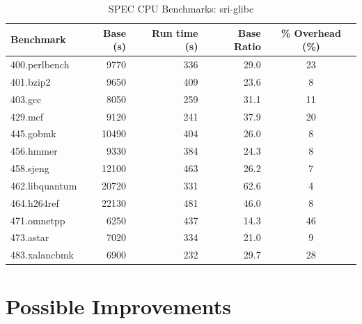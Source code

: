 \documentclass[12pt]{cslreport}
\begin{document}
\begin{table}
\begin{center}
\begin{tabular}{|l|r|r|r|c|}
\hline
Benchmark  & Base  (s)  & Run time (s) &  Base Ratio & \% Overhead (\%)\\
\hline
400.perlbench   &  9770        &  336       &  29.0 & 23 \\
401.bzip2       &  9650        &  409       &  23.6 & 8  \\
403.gcc         &  8050        &  259       &  31.1 & 11 \\
429.mcf         &  9120        &  241       &  37.9 & 20 \\
445.gobmk       &  10490       &   404      &  26.0 & 8  \\
456.hmmer       &   9330       &   384      &  24.3 & 8  \\
458.sjeng       &  12100       &   463      &  26.2 & 7  \\
462.libquantum  &  20720       &   331      &  62.6 & 4  \\
464.h264ref     &  22130       &   481      &  46.0 & 8  \\
471.omnetpp     &   6250       &   437      &  14.3 & 46 \\
473.astar       &   7020       &   334      &  21.0 & 9  \\
483.xalancbmk   &   6900       &   232      &  29.7 & 28 \\
\hline
\end{tabular}
\end{center}
\caption{SPEC CPU Benchmarks: sri-glibc}
\label{sri-glibc:spec}
\end{table}



\section{Possible Improvements}
\end{document}
